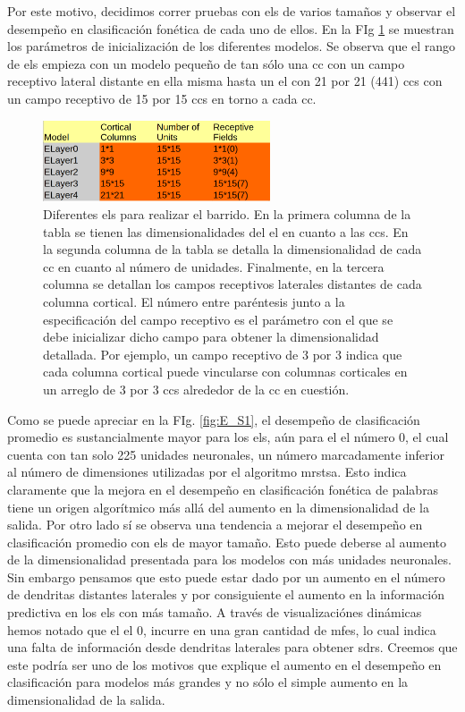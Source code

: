 Por este motivo, decidimos correr pruebas con \glspl{el} de varios tama\~nos y observar el desempe\~no en clasificación fonética de cada uno de ellos. En la FIg \ref{fig:E_S} se muestran los parámetros de inicialización de los diferentes modelos. Se observa que el rango de \glspl{el} empieza con un modelo peque\~no de tan sólo una \gls{cc} con un campo receptivo lateral distante en ella misma hasta un \gls{el} con 21 por 21 (441) \glspl{cc} con un campo receptivo de 15 por 15 \glspl{cc} en torno a cada \gls{cc}.
\begin{figure}[h!]
    \centering
    \includegraphics[width=0.6\textwidth]{Encoder_Swept.png}
    \caption{Diferentes \glspl{el} para realizar el barrido. En la primera columna de la tabla se tienen las dimensionalidades del \gls{el} en cuanto a las \glspl{cc}. En la segunda columna de la tabla se detalla la dimensionalidad de cada \gls{cc} en cuanto al número de unidades. Finalmente, en la tercera columna se detallan los campos receptivos laterales distantes de cada columna cortical. El número entre paréntesis junto a la especificación del campo receptivo es el parámetro con el que se debe inicializar dicho campo para obtener la dimensionalidad detallada. Por ejemplo, un campo receptivo de 3 por 3 indica que cada columna cortical puede vincularse con columnas corticales en un arreglo de 3 por 3 \glspl{cc} alrededor de la \gls{cc} en cuestión.}
    \label{fig:E_S}
\end{figure}

Como se puede apreciar en la FIg. \ref{fig:E_S1}, el desempe\~no de clasificación promedio es sustancialmente mayor para los \glspl{el}, aún para el \gls{el} número 0, el cual cuenta con tan solo 225 unidades neuronales, un número marcadamente inferior al número de dimensiones utilizadas por el algoritmo \gls{mrstsa}. Esto indica claramente que la mejora en el desempeño en clasificación fonética de palabras tiene un origen algorítmico más allá del aumento en la dimensionalidad de la salida. Por otro lado sí se observa una tendencia a mejorar el desempe\~no en clasificación promedio con \glspl{el} de mayor tama\~no. Esto puede deberse al aumento de la dimensionalidad presentada para los modelos con más unidades neuronales. Sin embargo pensamos que esto puede estar dado por un aumento en el número de dendritas distantes laterales y por consiguiente el aumento en la información predictiva en los \glspl{el} con más tama\~no. A través de visualizaciónes dinámicas hemos notado que el \gls{el} 0, incurre en una gran cantidad de \glspl{mfe}, lo cual indica una falta de información desde dendritas laterales para obtener \glspl{sdr}. Creemos que este podría ser uno de los motivos que explique el aumento en el desempe\~no en clasificación para modelos más grandes y no sólo el simple aumento en la dimensionalidad de la salida.


